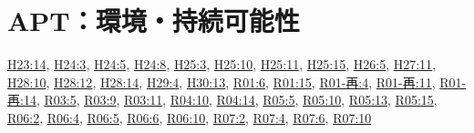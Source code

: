 \section{APT：環境・持続可能性}
\hyperref[q:h23-reg-apt-14]{H23:14}, \hyperref[q:h24-reg-apt-03]{H24:3}, \hyperref[q:h24-reg-apt-05]{H24:5}, \hyperref[q:h24-reg-apt-08]{H24:8}, \hyperref[q:h25-reg-apt-03]{H25:3}, \hyperref[q:h25-reg-apt-10]{H25:10}, \hyperref[q:h25-reg-apt-11]{H25:11}, \hyperref[q:h25-reg-apt-15]{H25:15}, \hyperref[q:h26-reg-apt-05]{H26:5}, \hyperref[q:h27-reg-apt-11]{H27:11}, \hyperref[q:h28-reg-apt-10]{H28:10}, \hyperref[q:h28-reg-apt-12]{H28:12}, \hyperref[q:h28-reg-apt-14]{H28:14}, \hyperref[q:h29-reg-apt-04]{H29:4}, \hyperref[q:h30-reg-apt-13]{H30:13}, \hyperref[q:r01-reg-apt-06]{R01:6}, \hyperref[q:r01-reg-apt-15]{R01:15}, \hyperref[q:r01-ret-apt-04]{R01-再:4}, \hyperref[q:r01-ret-apt-11]{R01-再:11}, \hyperref[q:r01-ret-apt-14]{R01-再:14}, \hyperref[q:r03-reg-apt-05]{R03:5}, \hyperref[q:r03-reg-apt-09]{R03:9}, \hyperref[q:r03-reg-apt-11]{R03:11}, \hyperref[q:r04-reg-apt-10]{R04:10}, \hyperref[q:r04-reg-apt-14]{R04:14}, \hyperref[q:r05-reg-apt-05]{R05:5}, \hyperref[q:r05-reg-apt-10]{R05:10}, \hyperref[q:r05-reg-apt-13]{R05:13}, \hyperref[q:r05-reg-apt-15]{R05:15}, \hyperref[q:r06-reg-apt-02]{R06:2}, \hyperref[q:r06-reg-apt-04]{R06:4}, \hyperref[q:r06-reg-apt-05]{R06:5}, \hyperref[q:r06-reg-apt-06]{R06:6}, \hyperref[q:r06-reg-apt-10]{R06:10}, \hyperref[q:r07-reg-apt-02]{R07:2}, \hyperref[q:r07-reg-apt-04]{R07:4}, \hyperref[q:r07-reg-apt-06]{R07:6}, \hyperref[q:r07-reg-apt-10]{R07:10}
